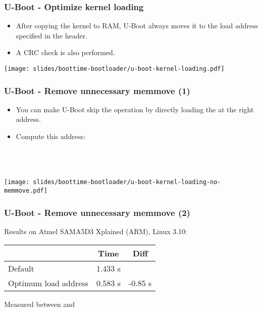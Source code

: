 \begin{frame}
\frametitle{U-Boot - Optimize kernel loading}
\begin{itemize}
\item After copying the kernel  to RAM,
      U-Boot always moves it to the load address specified
      in the  header.
\item A CRC check is also performed.
\end{itemize}
\begin{center}
    \texttt{[image: slides/boottime-bootloader/u-boot-kernel-loading.pdf]}
\end{center}
\end{frame}

\begin{frame}
\frametitle{U-Boot - Remove unnecessary memmove (1)}
\begin{itemize}
\item You can make U-Boot skip the  operation
      by directly loading the  at the right
      address.
\item Compute this address: \\
      {\small
      \\
      \\ 
      \\
      }
\end{itemize}
\begin{center}
    \texttt{[image: slides/boottime-bootloader/u-boot-kernel-loading-no-memmove.pdf]}
\end{center}
\end{frame}

\begin{frame}
\frametitle{U-Boot - Remove unnecessary memmove (2)}
Results on Atmel SAMA5D3 Xplained (ARM), Linux 3.10:
\newline\newline
\begin{tabular}{| l || c | c |}
\hline
& Time & Diff \\
\hline
Default & 1.433 s & \\
Optimum load address & 0.583 s & -0.85 s\\
\hline
\end{tabular}
\newline\newline
\small
Measured between  and 
\end{frame}


